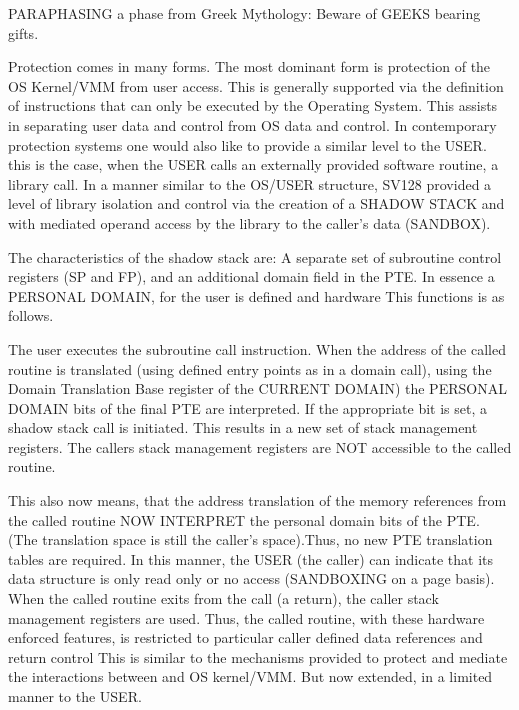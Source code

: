 \documentclass{article}
\begin{document}
PARAPHASING  a phase from Greek Mythology: Beware of GEEKS bearing gifts.

Protection comes in many forms.  The most dominant form is protection of  the OS Kernel/VMM from user access. This is generally supported via the definition of instructions that  can only be executed by the Operating System.  This assists in separating user data and control from OS  data and control.  In contemporary protection systems one would also like to provide a similar level to the USER.  this is the case, when the USER calls an externally provided software routine,  a library call. In a manner similar to the OS/USER structure, SV128 provided a level of library isolation and control via the creation of a SHADOW STACK  and with mediated operand access by the library to the caller's data (SANDBOX).

The characteristics of the shadow stack are:  A separate set of subroutine control registers (SP and FP),  and an additional domain field in the PTE.  In essence a PERSONAL DOMAIN, for the user is defined and hardware  This functions is as follows.

The user executes the subroutine call instruction.  When the address of the called routine is translated (using defined entry points as in a domain call), using the Domain Translation Base register of the CURRENT DOMAIN)  the PERSONAL DOMAIN bits of the final PTE are interpreted. If the appropriate bit is set,     a shadow stack call is initiated. This results in a new set of stack management registers.  The callers stack management registers are NOT  accessible to the called routine.

This also now means,  that the  address translation of the memory references from the called routine  NOW INTERPRET  the personal domain bits of the PTE.  (The translation space is still the caller’s space).Thus, no new PTE translation tables are required.   In this manner, the USER (the caller) can indicate that its data structure is only read only or no access (SANDBOXING on a page basis).  When the called routine exits from the call (a return),  the caller stack management registers are used.  Thus, the called routine, with these hardware enforced features,   is restricted to particular caller defined data references and return control This is similar to the mechanisms provided to protect and mediate the interactions between and OS kernel/VMM.  But now extended,  in a limited manner to the USER.
\end{document}

